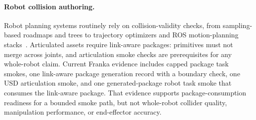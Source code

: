 \paragraph{Robot collision authoring.}
Robot planning systems routinely rely on collision-validity checks, from sampling-based roadmaps and trees to trajectory optimizers and ROS motion-planning stacks~\cite{kavraki1996prm,lavalle2001kinodynamic,kuffner2000rrtconnect,karaman2011rrtstar,zucker2013chomp,kalakrishnan2011stomp,schulman2014trajopt,sucan2012ompl,chitta2012moveit,zolotas2025robotcollisionchecking}.
Articulated assets require link-aware packages: primitives must not merge across joints, and articulation smoke checks are prerequisites for any whole-robot claim.
Current Franka evidence includes capped package task smokes, one link-aware package generation record with a boundary check, one USD articulation smoke, and one generated-package robot task smoke that consumes the link-aware package.
That evidence supports package-consumption readiness for a bounded smoke path, but not whole-robot collider quality, manipulation performance, or end-effector accuracy.
